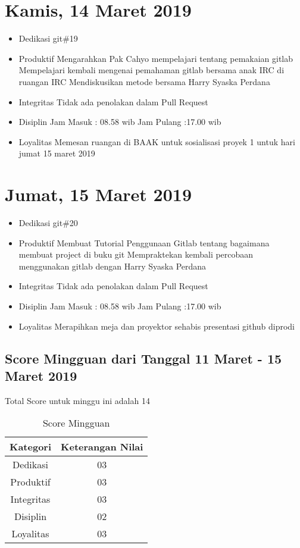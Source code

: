 \section{Kamis, 14 Maret 2019}
\begin{itemize}
\item Dedikasi
\subitem git\#19
\item Produktif
  \subitem Mengarahkan Pak Cahyo mempelajari tentang pemakaian gitlab
  \subitem Mempelajari kembali mengenai pemahaman gitlab bersama anak IRC di ruangan IRC
  \subitem Mendiskusikan metode bersama Harry Syaska Perdana
\item Integritas
  \subitem Tidak ada penolakan dalam Pull Request
\item Disiplin
  \subitem Jam Masuk : 08.58 wib
  \subitem Jam Pulang :17.00 wib
\item Loyalitas
  \subitem Memesan ruangan di BAAK untuk sosialisasi proyek 1 untuk hari jumat 15 maret 2019
\end{itemize}

\section{Jumat, 15 Maret 2019}
\begin{itemize}
\item Dedikasi
\subitem git\#20
\item Produktif
  \subitem Membuat Tutorial Penggunaan Gitlab tentang bagaimana membuat project di buku git
  \subitem Mempraktekan kembali percobaan menggunakan gitlab dengan Harry Syaska Perdana
\item Integritas
  \subitem Tidak ada penolakan dalam Pull Request
\item Disiplin
  \subitem Jam Masuk : 08.58 wib
  \subitem Jam Pulang :17.00 wib
\item Loyalitas
  \subitem Merapihkan meja dan proyektor sehabis presentasi github diprodi
\end{itemize}

\subsection{Score Mingguan dari Tanggal 11 Maret - 15 Maret 2019}
Total Score untuk minggu ini adalah 14

\begin{table}[h]
\caption{Score Mingguan}
\centering
\begin{tabular}{|c|c|}
\hline
\textbf{Kategori}&\textbf{Keterangan Nilai}\\
\hline
Dedikasi&03\\
\hline
Produktif&03\\
\hline
Integritas&03\\
\hline
Disiplin&02\\
\hline
Loyalitas&03\\
\hline
\end{tabular}
\label{table:score mingguan}
\end{table}

